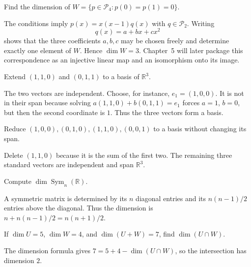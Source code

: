 \begin{problem}\label{prob:i03-problem-02}
Find the dimension of $W=\{p\in\mathcal P_4:p(0)=p(1)=0\}$.
\end{problem}
\begin{solution}
The conditions imply $p(x)=x(x-1)q(x)$ with $q\in\mathcal P_2$. Writing
\[
q(x)=a+bx+cx^2
\]
shows that the three coefficients $a,b,c$ may be chosen freely and determine exactly one element of $W$. Hence $\dim W=3$. Chapter~5 will later package this correspondence as an injective linear map and an isomorphism onto its image.
\end{solution}

\begin{problem}\label{prob:i03-problem-03}
Extend $(1,1,0)$ and $(0,1,1)$ to a basis of $\mathbb R^3$.
\end{problem}
\begin{solution}
The two vectors are independent. Choose, for instance, $e_1=(1,0,0)$. It is not in their span because solving $a(1,1,0)+b(0,1,1)=e_1$ forces $a=1$, $b=0$, but then the second coordinate is $1$. Thus the three vectors form a basis.
\end{solution}

\begin{problem}\label{prob:i03-problem-04}
Reduce $(1,0,0),(0,1,0),(1,1,0),(0,0,1)$ to a basis without changing its span.
\end{problem}
\begin{solution}
Delete $(1,1,0)$ because it is the sum of the first two. The remaining three standard vectors are independent and span $\mathbb R^3$.
\end{solution}

\begin{problem}\label{prob:i03-problem-05}
Compute $\dim \operatorname{Sym}_n(\mathbb R)$.
\end{problem}
\begin{solution}
A symmetric matrix is determined by its $n$ diagonal entries and its $n(n-1)/2$ entries above the diagonal. Thus the dimension is $n+n(n-1)/2=n(n+1)/2$.
\end{solution}

\begin{problem}\label{prob:i03-problem-06}
If $\dim U=5$, $\dim W=4$, and $\dim(U+W)=7$, find $\dim(U\cap W)$.
\end{problem}
\begin{solution}
The dimension formula gives $7=5+4-\dim(U\cap W)$, so the intersection has dimension $2$.
\end{solution}


